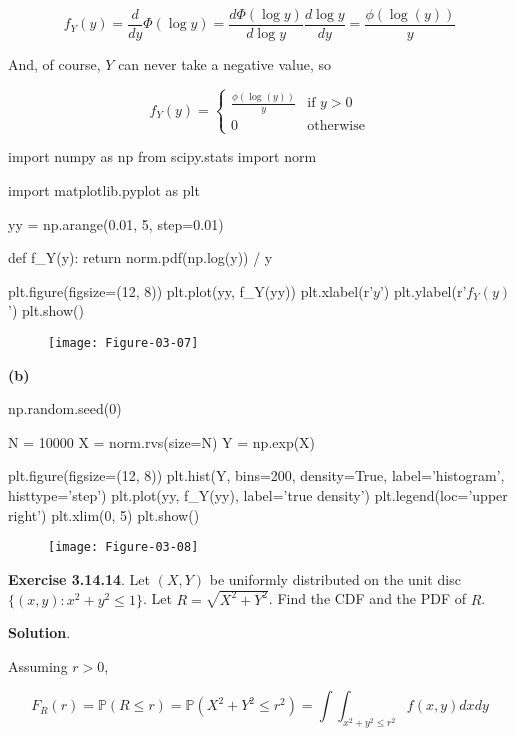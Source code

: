 \[ f_Y(y) = \frac{d}{dy} \Phi(\log y) = \frac{d \Phi(\log y)}{d \log y} \frac{d \log y}{dy} = \frac{\phi(\log(y))}{y} \]

And, of course, \(Y\) can never take a negative value, so

\[ f_Y(y) = \begin{cases}
\frac{\phi(\log(y))}{y} &\text{if } y > 0 \\
0 &\text{otherwise}
\end{cases} \]

\begin{python}
import numpy as np
from scipy.stats import norm

import matplotlib.pyplot as plt

yy = np.arange(0.01, 5, step=0.01)

def f_Y(y):
    return norm.pdf(np.log(y)) / y

plt.figure(figsize=(12, 8))
plt.plot(yy, f_Y(yy))
plt.xlabel(r'$y$')
plt.ylabel(r'$f_Y(y)$')
plt.show()
\end{python}

\begin{figure}[H]
\texttt{[image: Figure-03-07]}
\end{figure}

\textbf{(b)}

\begin{python}
np.random.seed(0)

N = 10000
X = norm.rvs(size=N)
Y = np.exp(X)

plt.figure(figsize=(12, 8))
plt.hist(Y, bins=200, density=True, label='histogram', histtype='step')
plt.plot(yy, f_Y(yy), label='true density')
plt.legend(loc='upper right')
plt.xlim(0, 5)
plt.show()
\end{python}

\begin{figure}[H]
\texttt{[image: Figure-03-08]}
\end{figure}

\textbf{Exercise 3.14.14}. Let \((X, Y)\) be uniformly distributed on
the unit disc \(\{ (x, y) : x^2 + y^2 \leq 1 \}\). Let
\(R = \sqrt{X^2 + Y^2}\). Find the CDF and the PDF of \(R\).

\textbf{Solution}.

Assuming \(r > 0\),

\[ F_R(r) = \mathbb{P}(R \leq r) = \mathbb{P}(X^2 + Y^2 \leq r^2) = \int \int_{x^2 + y^2 \leq r^2} f(x, y) dx dy \]

